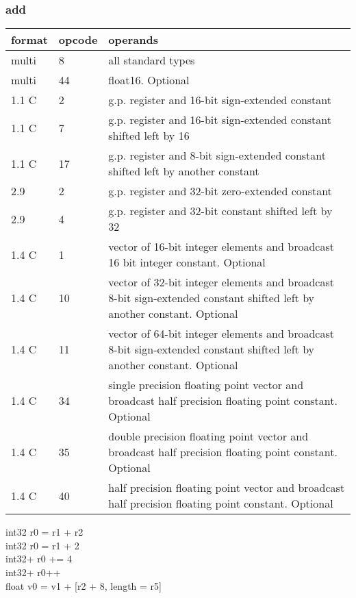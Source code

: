 \documentclass[forwardcom.tex]{subfiles}
\begin{document}
\subsubsection{add}
\label{table:addInstruction}
\begin{tabular}{|p{12mm}|p{12mm}|p{110mm}|}
\hline
\bfseries format & \bfseries opcode & \bfseries operands \\ \hline
multi &  8 & all standard types \\ \hline
multi & 44 & float16. Optional \\ \hline
1.1 C &  2 & g.p. register and 16-bit sign-extended constant \\ \hline
1.1 C &  7 & g.p. register and 16-bit sign-extended constant shifted left by 16 \\ \hline
1.1 C & 17 & g.p. register and 8-bit sign-extended constant shifted left by another constant \\ \hline
2.9   &  2 & g.p. register and 32-bit zero-extended constant \\ \hline
2.9   &  4 & g.p. register and 32-bit constant shifted left by 32 \\ \hline
1.4 C &  1 & vector of 16-bit integer elements and broadcast 16 bit integer constant. Optional \\ \hline
1.4 C & 10 & vector of 32-bit integer elements and broadcast 8-bit sign-extended constant shifted left by another constant. Optional \\ \hline
1.4 C & 11 & vector of 64-bit integer elements and broadcast 8-bit sign-extended constant shifted left by another constant. Optional \\ \hline
1.4 C & 34 & single precision floating point vector and broadcast half precision floating point constant. Optional \\ \hline
1.4 C & 35 & double precision floating point vector and broadcast half precision floating point constant. Optional \\ \hline
1.4 C & 40 & half precision floating point vector and broadcast half precision floating point constant. Optional \\ \hline
\end{tabular}
\vspace{2mm}

int32 r0 = r1 + r2 \\
int32 r0 = r1 + 2 \\
int32+ r0 += 4 \\
int32+ r0++ \\
float v0 = v1 + [r2 + 8, length = r5]
\vspace{2mm}
\end{document}
